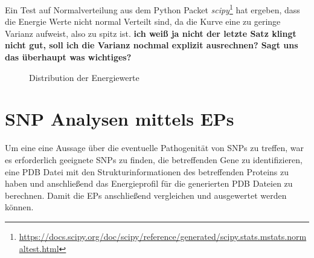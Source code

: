 Ein Test auf Normalverteilung aus dem Python Packet \emph{scipy}\footnote{\url{https://docs.scipy.org/doc/scipy/reference/generated/scipy.stats.mstats.normaltest.html}} hat ergeben, dass die Energie Werte nicht normal Verteilt sind, da die Kurve eine zu geringe Varianz aufweist, also zu spitz ist.  \textbf{ich weiß ja nicht der letzte Satz klingt nicht gut, soll ich die Varianz nochmal explizit ausrechnen? Sagt uns das überhaupt was wichtiges?}

\begin{figure} 
    \caption{Distribution der Energiewerte} 
    \label{fig:ep_as_distr}
\end{figure} 


\newpage
\section{SNP Analysen mittels EPs}
\label{sec:snp_analyse}

Um eine eine Aussage über die eventuelle Pathogenität von \ac{SNPs} zu treffen, war es erforderlich geeignete \ac{SNPs} zu finden, die betreffenden Gene zu identifizieren, eine \ac{PDB} Datei mit den Strukturinformationen des betreffenden Proteins zu haben und anschließend das Energieprofil für die generierten \ac{PDB} Dateien zu berechnen. Damit die \ac{EPs} anschließend vergleichen und ausgewertet werden können.


